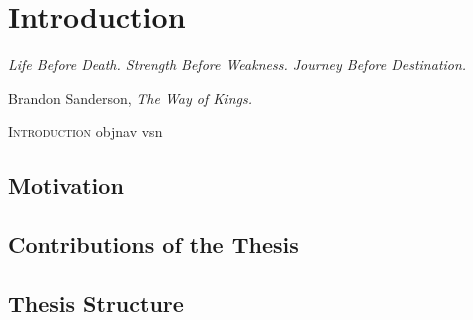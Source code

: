 \chapter{Introduction}\label{ch:introduction}

\setlength{}
\epigraph{\itshape Life Before Death. Strength Before Weakness. Journey Before Destination.}{Brandon Sanderson, \textit{The Way of Kings.}}

\lettrine{\textcolor{accent_color}{I}}{ntroduction} \acrshort{objnav} \acrfull{vsn} \lipsum[1-4]

\section{Motivation}\label{sec:motivation}


\section{Contributions of the Thesis}\label{sec:contributions-of-the-thesis}


\section{Thesis Structure}\label{sec:thesis-structure}
